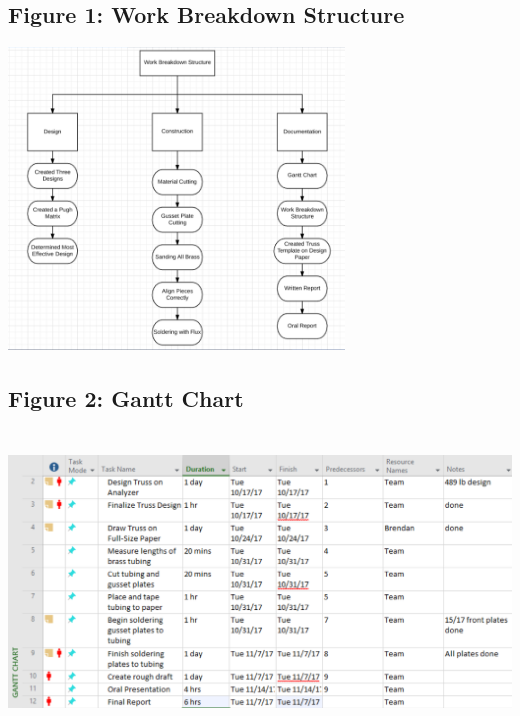 \documentclass{article}
\begin{document}
\subsection{Figure 1: Work Breakdown Structure}
\begin{center}{\includegraphics[height=8cm]{WorkBreakdown.png}}\end{center}

\subsection{Figure 2: Gantt Chart}
\begin{center}{\includegraphics[height=8cm]{GanttChart.png}}\end{center}
\end{document}
